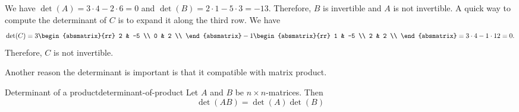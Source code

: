 \begin{solution}
  We have $\det(A) = 3\cdot 4 - 2\cdot 6 = 0$ and $\det(B) = 2\cdot
  1-5\cdot 3 = -13$. Therefore, $B$ is invertible and $A$ is not
  invertible. A quick way to compute the determinant of $C$ is to
  expand it along the third row. We have
  \begin{equation*}
    \det(C)
    = 3\begin{absmatrix}{rr}
      2 & -5 \\
      0 & 2 \\
    \end{absmatrix}
    - 1\begin{absmatrix}{rr}
      1 & -5 \\
      2 & 2 \\
    \end{absmatrix}
    = 3\cdot 4 - 1\cdot 12 = 0.
  \end{equation*}
  Therefore, $C$ is not invertible.
\end{solution}

Another reason the determinant is important is that it compatible with
matrix product.

\begin{theorem}{Determinant of a product}{determinant-of-product}
  Let $A$ and $B$ be $n\times n$-matrices. Then%
  \begin{equation*}
    \det(AB) =\det(A)\det(B)
  \end{equation*}
\end{theorem}

